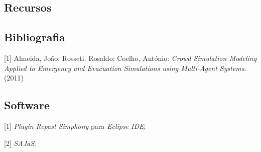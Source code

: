 \documentclass[12pt]{article}
\begin{document}
\begin{titlepage}
\section{Recursos}
\subsection{Bibliografia}
[1] Almeida, João; Rosseti, Rosaldo; Coelho, António: \textit{Crowd Simulation Modeling Applied to Emergency and Evacuation Simulations using Multi-Agent Systems}. (2011)

\subsection{Software}
[1] \textit{Plugin Repast Simphony} para \textit{Eclipse IDE};

[2] \textit{SAJaS}.

\end{titlepage}
\end{document}

